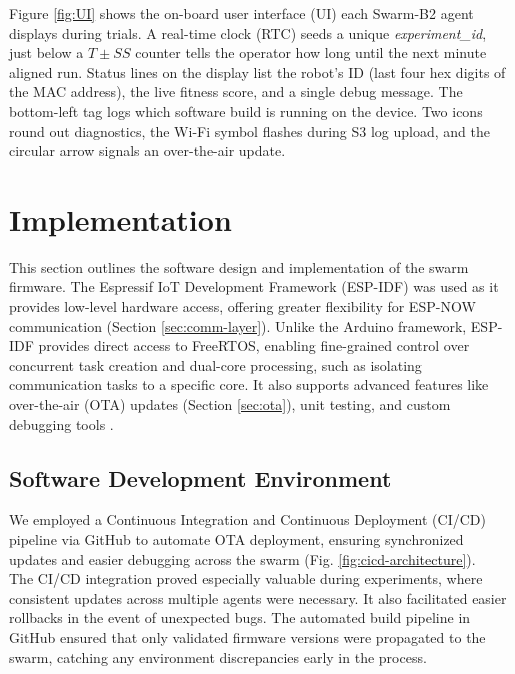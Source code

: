 \documentclass[conference]{IEEEtran}
\begin{document}
Figure \ref{fig:UI} shows the on-board user interface (UI) each Swarm-B2 agent displays during trials. A real-time clock (RTC) seeds a unique \emph{experiment\_id}, just below a $T\pm SS$ counter tells the operator how long until the next minute aligned run. Status lines on the display list the robot's ID (last four hex digits of the MAC address), the live fitness score, and a single debug message. The bottom-left tag logs which software build is running on the device. Two icons round out diagnostics, the Wi-Fi symbol flashes during S3 log upload, and the circular arrow signals an over-the-air update.

\section{Implementation}

This section outlines the software design and implementation of the swarm firmware. The Espressif IoT Development Framework (ESP-IDF) was used as it provides low-level hardware access, offering greater flexibility for ESP-NOW communication (Section \ref{sec:comm-layer}). Unlike the Arduino framework, ESP-IDF provides direct access to FreeRTOS, enabling fine-grained control over concurrent task creation and dual-core processing, such as isolating communication tasks to a specific core. It also supports advanced features like over-the-air (OTA) updates (Section \ref{sec:ota}), unit testing, and custom debugging tools \cite{esp-boards_esp-idf_nodate}.

\subsection{Software Development Environment}\label{sec:SDK}

We employed a Continuous Integration and Continuous Deployment (CI/CD) pipeline via GitHub to automate OTA deployment, ensuring synchronized updates and easier debugging across the swarm (Fig. \ref{fig:cicd-architecture}).\\

The CI/CD integration proved especially valuable during experiments, where consistent updates across multiple agents were necessary. It also facilitated easier rollbacks in the event of unexpected bugs. The automated build pipeline in GitHub ensured that only validated firmware versions were propagated to the swarm, catching any environment discrepancies early in the process.\\
\end{document}
